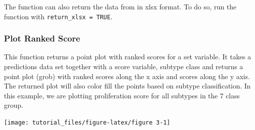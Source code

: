 \documentclass[
]{article}
\begin{document}
The function can also return the data from in xlsx format. To do so, run
the function with \texttt{return\_xlsx\ =\ TRUE}.

\subsubsection{Plot Ranked Score}\label{plot-ranked-score}

This function returns a point plot with ranked scores for a set
variable. It takes a predictions data set together with a score
variable, subtype class and returns a point plot (grob) with ranked
scores along the x axis and scores along the y axis. The returned plot
will also color fill the points based on subtype classification. In this
example, we are plotting proliferation score for all subtypes in the 7
class group.

\begin{center}\texttt{[image: tutorial\_files/figure-latex/figure 3-1]} \end{center}
\end{document}
